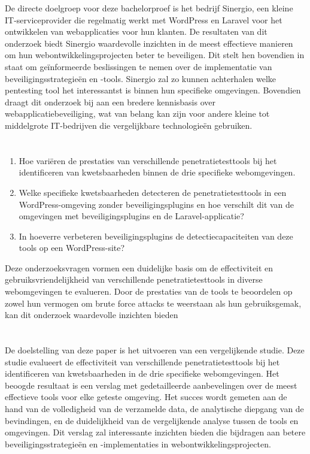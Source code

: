 De directe doelgroep voor deze bachelorproef is het bedrijf Sinergio, een kleine IT-serviceprovider die regelmatig 
werkt met WordPress en Laravel voor het ontwikkelen van webapplicaties voor hun klanten. De resultaten van dit 
onderzoek biedt Sinergio waardevolle inzichten in de meest effectieve manieren om hun webontwikkelingsprojecten beter 
te beveiligen. Dit stelt hen bovendien in staat om geïnformeerde beslissingen te nemen over de implementatie van 
beveiligingsstrategieën en -tools. Sinergio zal zo kunnen achterhalen welke pentesting tool het interessantst is binnen hun specifieke omgevingen.
Bovendien draagt dit onderzoek bij aan een bredere kennisbasis over webapplicatiebeveiliging, 
wat van belang kan zijn voor andere kleine tot middelgrote IT-bedrijven die vergelijkbare technologieën gebruiken.

\section{}%
\label{sec:onderzoeksvraag}
\begin{enumerate}
  \item Hoe variëren de prestaties van verschillende penetratietesttools bij het identificeren van kwetsbaarheden binnen de drie specifieke webomgevingen. 
  \item Welke specifieke kwetsbaarheden detecteren de penetratietesttools in een WordPress-omgeving zonder beveiligingsplugins en hoe verschilt dit van de omgevingen met beveiligingsplugins en de Laravel-applicatie? 
  \item In hoeverre verbeteren beveiligingsplugins de detectiecapaciteiten van deze tools op een WordPress-site? 
\end{enumerate}
Deze onderzoeksvragen vormen een duidelijke basis om de effectiviteit en gebruiksvriendelijkheid van 
verschillende penetratietesttools in diverse webomgevingen te evalueren. Door de prestaties van de 
tools te beoordelen op zowel hun vermogen om brute force attacks te weerstaan als hun gebruiksgemak, 
kan dit onderzoek waardevolle inzichten bieden

\section{}%
\label{sec:onderzoeksdoelstelling}
De doelstelling van deze paper is het uitvoeren van een vergelijkende studie. Deze studie evalueert de effectiviteit van 
verschillende penetratietesttools bij het identificeren van kwetsbaarheden in de drie specifieke webomgevingen.
Het beoogde resultaat is een verslag met gedetailleerde aanbevelingen over de meest effectieve tools voor elke geteste 
omgeving. Het succes wordt gemeten aan de hand van de volledigheid van de verzamelde data, de analytische diepgang van de bevindingen, 
en de duidelijkheid van de vergelijkende analyse tussen de tools en omgevingen. Dit verslag zal interessante inzichten bieden die 
bijdragen aan betere beveiligingsstrategieën en -implementaties in webontwikkelingsprojecten.
